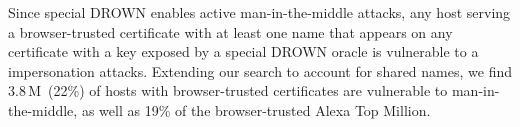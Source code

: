 Since special DROWN enables active man-in-the-middle attacks, any host serving
a browser-trusted certificate with at least one name that appears on any
certificate with a key exposed by a special DROWN oracle is vulnerable to a
impersonation attacks. Extending our search to account for shared names, we
find 3.8\,M~(22\%) of hosts with browser-trusted certificates are vulnerable to
man-in-the-middle, as well as 19\% of the browser-trusted Alexa Top Million.
